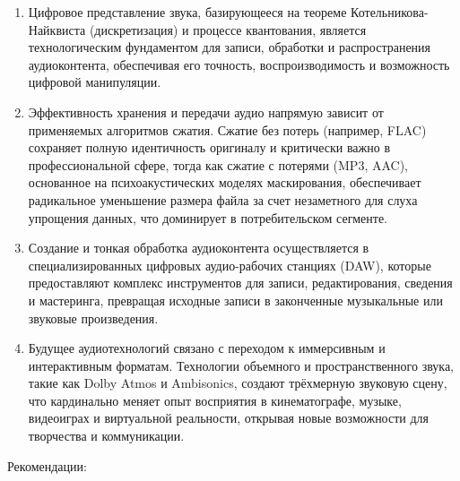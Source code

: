 \documentclass{SibFU-docs}
\begin{document}
\begin{enumerate}
    \item Цифровое представление звука, базирующееся на теореме Котельникова-Найквиста (дискретизация) и процессе квантования, является технологическим фундаментом для записи, обработки и распространения аудиоконтента, обеспечивая его точность, воспроизводимость и возможность цифровой манипуляции.
    
    \item Эффективность хранения и передачи аудио напрямую зависит от применяемых алгоритмов сжатия. Сжатие без потерь (например, FLAC) сохраняет полную идентичность оригиналу и критически важно в профессиональной сфере, тогда как сжатие с потерями (MP3, AAC), основанное на психоакустических моделях маскирования, обеспечивает радикальное уменьшение размера файла за счет незаметного для слуха упрощения данных, что доминирует в потребительском сегменте.

    \item Создание и тонкая обработка аудиоконтента осуществляется в специализированных цифровых аудио-рабочих станциях (DAW), которые предоставляют комплекс инструментов для записи, редактирования, сведения и мастеринга, превращая исходные записи в законченные музыкальные или звуковые произведения.

    \item Будущее аудиотехнологий связано с переходом к иммерсивным и интерактивным форматам. Технологии объемного и пространственного звука, такие как Dolby Atmos и Ambisonics, создают трёхмерную звуковую сцену, что кардинально меняет опыт восприятия в кинематографе, музыке, видеоиграх и виртуальной реальности, открывая новые возможности для творчества и коммуникации.
\end{enumerate}

Рекомендации:
\end{document}
